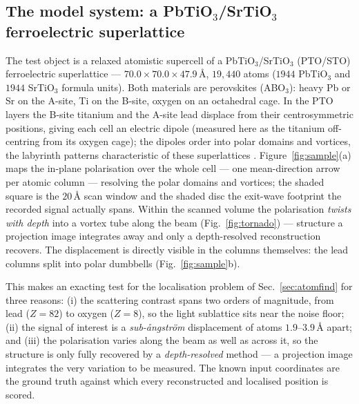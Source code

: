 \subsection{The model system: a PbTiO$_3$/SrTiO$_3$ ferroelectric superlattice}
\label{sec:sample}

The test object is a relaxed atomistic supercell of a PbTiO$_3$/SrTiO$_3$ (PTO/STO)
ferroelectric superlattice --- $70.0\times70.0\times47.9$\,\AA, $19{,}440$ atoms ($1944$
PbTiO$_3$ and $1944$ SrTiO$_3$ formula units). Both materials are perovskites (ABO$_3$):
heavy Pb or Sr on the A-site, Ti on the B-site, oxygen on an octahedral cage. In the PTO
layers the B-site titanium and the A-site lead displace from their centrosymmetric
positions, giving each cell an electric dipole (measured here as the titanium off-centring
from its oxygen cage); the dipoles order into polar domains and vortices, the labyrinth
patterns characteristic of these superlattices \citep{Yadav2016,Tang2015}.
Figure~\ref{fig:sample}(a) maps the in-plane polarisation over the whole cell --- one
mean-direction arrow per atomic column --- resolving the polar domains and vortices; the
shaded square is the $20$\,\AA{} scan window and the shaded disc the exit-wave footprint the
recorded signal actually spans. Within the scanned volume the polarisation \emph{twists
with depth} into a vortex tube along the beam (Fig.~\ref{fig:tornado}) --- structure a
projection image integrates away and only a depth-resolved reconstruction recovers. The
displacement is directly visible in the columns themselves: the lead columns split into polar
dumbbells (Fig.~\ref{fig:sample}b).

This makes an exacting test for the localisation problem of Sec.~\ref{sec:atomfind} for
three reasons: (i) the scattering contrast spans two orders of magnitude, from lead
($Z=82$) to oxygen ($Z=8$), so the light sublattice sits near the noise floor; (ii) the
signal of interest is a \emph{sub-\aa{}ngstr\"om} displacement of atoms $1.9$--$3.9$\,\AA{}
apart; and (iii) the polarisation varies along the beam as well as across it, so the
structure is only fully recovered by a \emph{depth-resolved} method --- a projection image
integrates the very variation to be measured. The known input coordinates are the ground
truth against which every reconstructed and localised position is scored.

